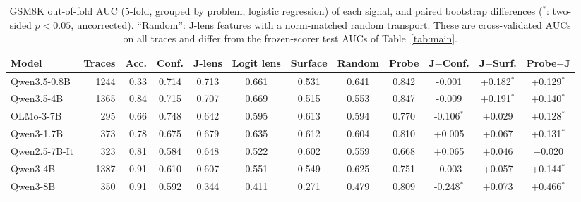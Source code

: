 \begin{table}[H]
\centering\small
\caption{GSM8K out-of-fold AUC (5-fold, grouped by problem, logistic regression) of each signal, and paired bootstrap differences ($^{*}$: two-sided $p<0.05$, uncorrected). ``Random'': J-lens features with a norm-matched random transport. These are cross-validated AUCs on all traces and differ from the frozen-scorer test AUCs of Table~\ref{tab:main}.}
\label{tab:auc}
\setlength{\tabcolsep}{4pt}
\begin{tabular}{lrr cccccc ccc}
\toprule
Model & Traces & Acc. & Conf. & J-lens & Logit lens & Surface & Random & Probe & J$-$Conf. & J$-$Surf. & Probe$-$J \\
\midrule
Qwen3.5-0.8B & 1244 & 0.33 & 0.714 & 0.713 & 0.661 & 0.531 & 0.641 & 0.842 & -0.001 & +0.182$^{*}$ & +0.129$^{*}$ \\
Qwen3.5-4B & 1365 & 0.84 & 0.715 & 0.707 & 0.669 & 0.515 & 0.553 & 0.847 & -0.009 & +0.191$^{*}$ & +0.140$^{*}$ \\
OLMo-3-7B & 295 & 0.66 & 0.748 & 0.642 & 0.595 & 0.613 & 0.594 & 0.770 & -0.106$^{*}$ & +0.029 & +0.128$^{*}$ \\
Qwen3-1.7B & 373 & 0.78 & 0.675 & 0.679 & 0.635 & 0.612 & 0.604 & 0.810 & +0.005 & +0.067 & +0.131$^{*}$ \\
Qwen2.5-7B-It & 323 & 0.81 & 0.584 & 0.648 & 0.522 & 0.602 & 0.559 & 0.668 & +0.065 & +0.046 & +0.020 \\
Qwen3-4B & 1387 & 0.91 & 0.610 & 0.607 & 0.551 & 0.549 & 0.625 & 0.751 & -0.003 & +0.057 & +0.144$^{*}$ \\
Qwen3-8B & 350 & 0.91 & 0.592 & 0.344 & 0.411 & 0.271 & 0.479 & 0.809 & -0.248$^{*}$ & +0.073 & +0.466$^{*}$ \\
\bottomrule
\end{tabular}
\end{table}
